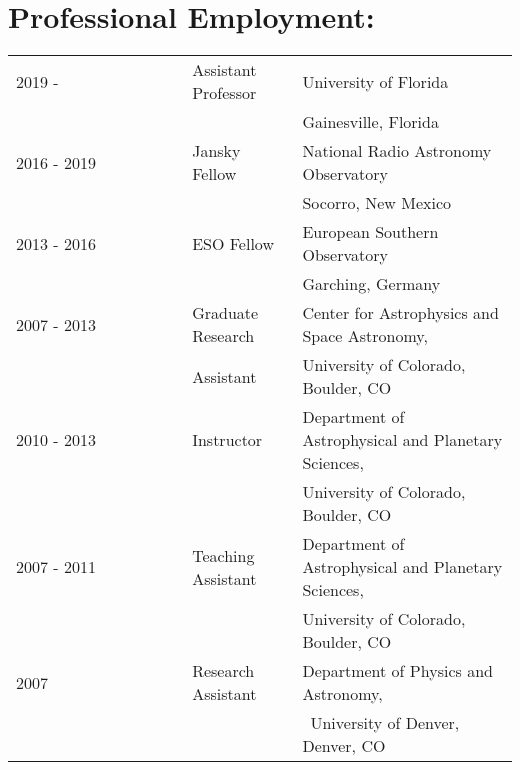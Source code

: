 \setlength{\extrarowheight}{2pt}
\section*{Professional Employment:}
\begin{listliketab}
    \begin{tabular}{lll}
    2019 -      & Assistant Professor & University of Florida \\
                                     && Gainesville, Florida \\
    2016 - 2019 & Jansky Fellow  & National Radio Astronomy Observatory\\
                 &         & Socorro, New Mexico \\
    2013 - 2016 & ESO Fellow  & European Southern Observatory\\
                 &         & Garching, Germany \\
    2007 - 2013 & Graduate Research & Center for Astrophysics and Space Astronomy, \\
              &   Assistant         & University of Colorado, Boulder, CO \\
    2010 - 2013 & Instructor  & Department of Astrophysical and Planetary Sciences, \\
                           && University of Colorado, Boulder, CO \\
    2007 - 2011    & Teaching Assistant & Department of Astrophysical and Planetary Sciences, \\
                                    && University of Colorado, Boulder, CO \\
    2007 & Research Assistant & Department of Physics and Astronomy, \\
                                          && University of Denver, Denver, CO \\
    \end{tabular}
\end{listliketab}

